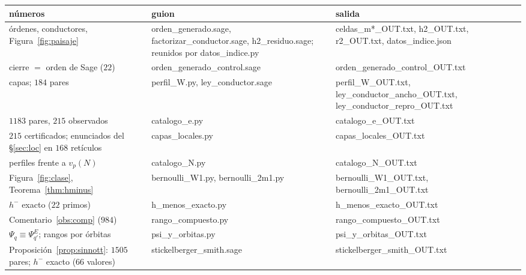 \documentclass[11pt,a4paper]{article}
\theoremstyle{definition}
\begin{document}
\begin{center}\footnotesize
{}
\begin{tabular}{p{}p{}p{}}
\toprule
números & guion & salida \\
\midrule
órdenes, conductores, Figura~\ref{fig:paisaje} & {\ttfamily\footnotesize orden\_generado.sage, factorizar\_conductor.sage, h2\_residuo.sage; reunidos por datos\_indice.py} & {\ttfamily\footnotesize celdas\_m*\_OUT.txt, \allowbreak h2\_OUT.txt, \allowbreak r2\_OUT.txt, \allowbreak datos\_indice.json} \\
cierre $=$ orden de Sage ($22$) & {\ttfamily\footnotesize orden\_generado\_control.sage} & {\ttfamily\footnotesize orden\_generado\_control\_OUT.txt} \\
capas; $184$ pares & {\ttfamily\footnotesize perfil\_W.py, ley\_conductor.sage} & {\ttfamily\footnotesize perfil\_W\_OUT.txt, \allowbreak ley\_conductor\_ancho\_OUT.txt, \allowbreak ley\_conductor\_repro\_OUT.txt} \\
$1183$ pares, $215$ observados & {\ttfamily\footnotesize catalogo\_e.py} & {\ttfamily\footnotesize catalogo\_e\_OUT.txt} \\
$215$ certificados; enunciados del \S\ref{sec:loc} en $168$ retículos & {\ttfamily\footnotesize capas\_locales.py} & {\ttfamily\footnotesize capas\_locales\_OUT.txt} \\
perfiles frente a $v_p(N)$ & {\ttfamily\footnotesize catalogo\_N.py} & {\ttfamily\footnotesize catalogo\_N\_OUT.txt} \\
Figura~\ref{fig:clase}, Teorema~\ref{thm:hminus} & {\ttfamily\footnotesize bernoulli\_W1.py, bernoulli\_2m1.py} & {\ttfamily\footnotesize bernoulli\_W1\_OUT.txt, \allowbreak bernoulli\_2m1\_OUT.txt} \\
$h^-$ exacto ($22$ primos) & {\ttfamily\footnotesize h\_menos\_exacto.py} & {\ttfamily\footnotesize h\_menos\_exacto\_OUT.txt} \\
Comentario~\ref{obs:comp} ($984$) & {\ttfamily\footnotesize rango\_compuesto.py} & {\ttfamily\footnotesize rango\_compuesto\_OUT.txt} \\
$\Psi_q\equiv\Psi_{q'}^E$; rangos por órbitas & {\ttfamily\footnotesize psi\_y\_orbitas.py} & {\ttfamily\footnotesize psi\_y\_orbitas\_OUT.txt} \\
Proposición~\ref{prop:sinnott}: $1505$ pares; $h^-$ exacto ($66$ valores) & {\ttfamily\footnotesize stickelberger\_smith.sage} & {\ttfamily\footnotesize stickelberger\_smith\_OUT.txt} \\

\end{tabular}
\end{center}
\end{document}
